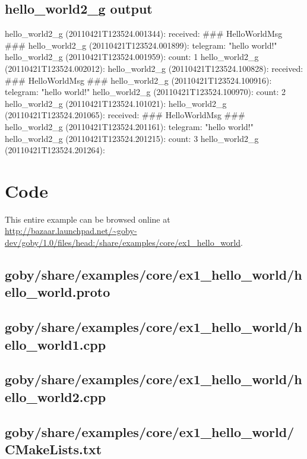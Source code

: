 \subsection{hello\_world2\_g output}
\begin{boxedverbatim}
hello_world2_g (20110421T123524.001344): received: ### HelloWorldMsg ###
hello_world2_g (20110421T123524.001899): telegram: "hello world!"
hello_world2_g (20110421T123524.001959): count: 1
hello_world2_g (20110421T123524.002012): 
hello_world2_g (20110421T123524.100828): received: ### HelloWorldMsg ###
hello_world2_g (20110421T123524.100916): telegram: "hello world!"
hello_world2_g (20110421T123524.100970): count: 2
hello_world2_g (20110421T123524.101021): 
hello_world2_g (20110421T123524.201065): received: ### HelloWorldMsg ###
hello_world2_g (20110421T123524.201161): telegram: "hello world!"
hello_world2_g (20110421T123524.201215): count: 3
hello_world2_g (20110421T123524.201264): 
\end{boxedverbatim}
\resetbvlinenumber


\section{Code} \label{sec:hello_example_code}

This entire example can be browsed online at \url{http://bazaar.launchpad.net/~goby-dev/goby/1.0/files/head:/share/examples/core/ex1_hello_world}.

\subsection{goby/share/examples/core/ex1\_hello\_world/hello\_world.proto} \label{sec:hello_world.proto}
\resetbvlinenumber

\subsection{goby/share/examples/core/ex1\_hello\_world/hello\_world1.cpp}\label{sec:hello_world1.cpp}
\resetbvlinenumber

\subsection{goby/share/examples/core/ex1\_hello\_world/hello\_world2.cpp}\label{sec:hello_world2.cpp}
\resetbvlinenumber
\subsection{goby/share/examples/core/ex1\_hello\_world/CMakeLists.txt}\label{sec:hello_world:CMakeLists.txt}
\resetbvlinenumber

\DeleteShortVerb{\!}
